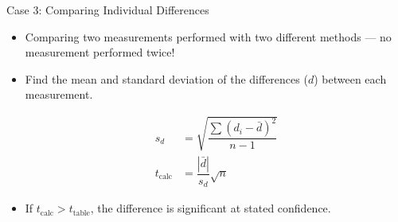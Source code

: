 \documentclass[letterpaper,11pt]{article}
\begin{document}
\begin{frame}{Case 3: Comparing Individual Differences}
	\begin{itemize}
		\item Comparing two measurements performed with two different
			methods --- no measurement performed twice!
		\item Find the mean and standard deviation of the
			\alert{differences} ($d$) between each measurement.

			\begin{align*}
				s_d & = \sqrt{\dfrac{\sum(d_i -
				\bar{d})^2}{n-1}} \\
				t_{\text{calc}} &= \dfrac{|\bar{d}|}{s_d}
				\sqrt{n}
			\end{align*}

		\item If $t_{\text{calc}} > t_{\text{table}}$, the difference is
			significant at stated confidence.
	\end{itemize}
\end{frame}
\end{document}
